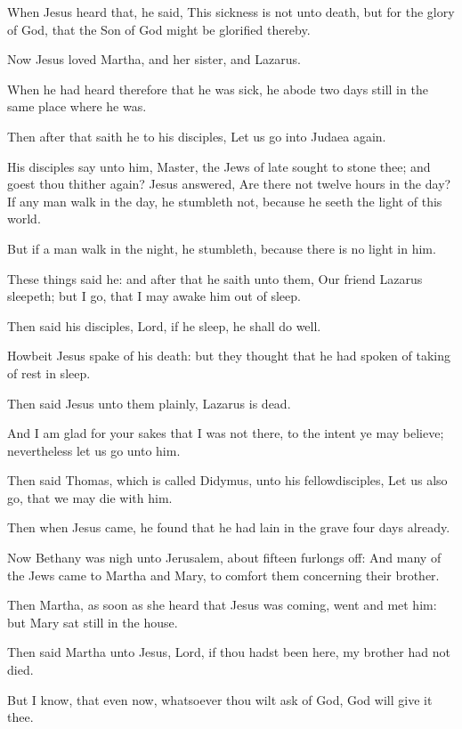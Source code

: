 \Verse When Jesus heard that, he said, This sickness is not unto death, but for the glory of God, that the Son of God might be glorified thereby.

\Verse Now Jesus loved Martha, and her sister, and Lazarus.

\Verse When he had heard therefore that he was sick, he abode two days still in the same place where he was.

\Verse Then after that saith he to his disciples, Let us go into Judaea again.

\Verse His disciples say unto him, Master, the Jews of late sought to stone thee; and goest thou thither again?  \Verse Jesus answered, Are there not twelve hours in the day? If any man walk in the day, he stumbleth not, because he seeth the light of this world.

\Verse But if a man walk in the night, he stumbleth, because there is no light in him.

\Verse These things said he: and after that he saith unto them, Our friend Lazarus sleepeth; but I go, that I may awake him out of sleep.

\Verse Then said his disciples, Lord, if he sleep, he shall do well.

\Verse Howbeit Jesus spake of his death: but they thought that he had spoken of taking of rest in sleep.

\Verse Then said Jesus unto them plainly, Lazarus is dead.

\Verse And I am glad for your sakes that I was not there, to the intent ye may believe; nevertheless let us go unto him.

\Verse Then said Thomas, which is called Didymus, unto his fellowdisciples, Let us also go, that we may die with him.

\Verse Then when Jesus came, he found that he had lain in the grave four days already.

\Verse Now Bethany was nigh unto Jerusalem, about fifteen furlongs off: \Verse And many of the Jews came to Martha and Mary, to comfort them concerning their brother.

\Verse Then Martha, as soon as she heard that Jesus was coming, went and met him: but Mary sat still in the house.

\Verse Then said Martha unto Jesus, Lord, if thou hadst been here, my brother had not died.

\Verse But I know, that even now, whatsoever thou wilt ask of God, God will give it thee.

